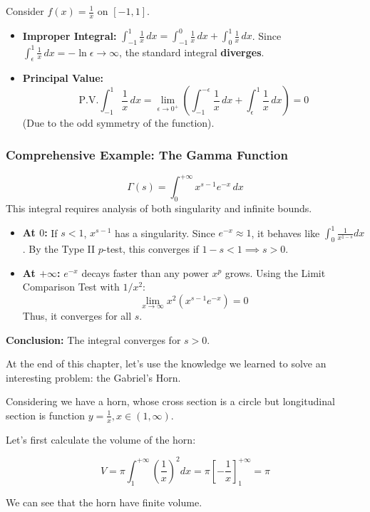 \begin{example}
Consider $f(x) = \frac{1}{x}$ on $[-1, 1]$.
\begin{itemize}
    \item \textbf{Improper Integral:} $\int_{-1}^1 \frac{1}{x} \, dx = \int_{-1}^0 \frac{1}{x} \, dx + \int_0^1 \frac{1}{x} \, dx$.
    Since $\int_{\epsilon}^1 \frac{1}{x} \, dx = -\ln \epsilon \to \infty$, the standard integral \textbf{diverges}.
    \item \textbf{Principal Value:}
    \[
    \text{P.V.} \int_{-1}^1 \frac{1}{x} \, dx = \lim_{\epsilon \to 0^+} \left( \int_{-1}^{-\epsilon} \frac{1}{x} \, dx + \int_{\epsilon}^1 \frac{1}{x} \, dx \right) = 0
    \]
    (Due to the odd symmetry of the function).
\end{itemize}
\end{example}

\subsubsection{Comprehensive Example: The Gamma Function}
\[
\Gamma(s) = \int_0^{+\infty} x^{s-1} e^{-x} \, dx
\]
This integral requires analysis of both singularity and infinite bounds.
\begin{itemize}
    \item \textbf{At $0$:} If $s < 1$, $x^{s-1}$ has a singularity. Since $e^{-x} \approx 1$, it behaves like $\int_0^1 \frac{1}{x^{1-s}} dx$. By the Type II $p$-test, this converges if $1-s < 1 \implies s > 0$.
    \item \textbf{At $+\infty$:} $e^{-x}$ decays faster than any power $x^p$ grows. Using the Limit Comparison Test with $1/x^2$:
    \[
    \lim_{x \to \infty} x^2 (x^{s-1} e^{-x}) = 0
    \]
    Thus, it converges for all $s$.
\end{itemize}
\textbf{Conclusion:} The integral converges for $s > 0$.

At the end of this chapter, let's use the knowledge we learned to solve an interesting problem: the Gabriel's Horn.

Considering we have a horn, whose cross section is a circle but longitudinal section is function $y = \frac{1}{x}, x \in (1,\infty)$.

Let's first calculate the volume of the horn:

\[V = \pi \int_{1}^{+\infty} (\frac{1}{x})^2 dx = \pi [-\frac{1}{x}]_{1}^{+\infty} = \pi\]

We can see that the horn have finite volume.


